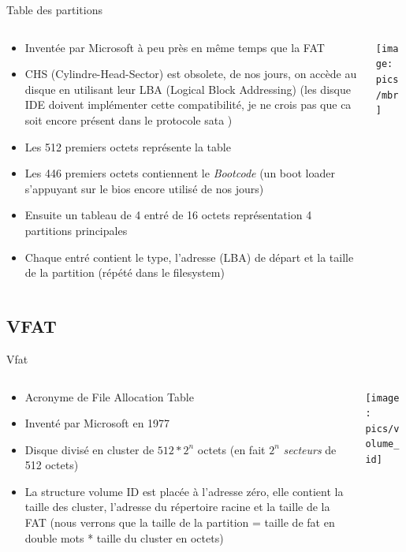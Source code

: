 \begin{frame}[fragile=singleslide]{Table des partitions}
  \begin{columns}
    \begin{column}{8cm}
      \begin{itemize}
      \item Inventée par Microsoft à peu près en même temps que la FAT
      \item CHS (Cylindre-Head-Sector) est  obsolete, de nos jours, on
        accède  au  disque  en   utilisant  leur  LBA  (Logical  Block
        Addressing)   (les  disque   IDE  doivent   implémenter  cette
        compatibilité, je ne crois pas que ca soit encore présent dans
        le protocole sata )
      \item Les 512 premiers octets représente la table
      \item Les 446 premiers octets contiennent le \emph{Bootcode} (un
        boot  loader s'appuyant  sur  le bios  encore  utilisé de  nos
        jours)
      \item Ensuite un tableau de  4 entré de 16 octets représentation
        4 partitions principales
      \item Chaque  entré contient le type, l'adresse  (LBA) de départ
        et la taille de la partition (répété dans le filesystem)
      \end{itemize}
    \end{column}
    \begin{column}{4cm}
      \texttt{[image: pics/mbr]}
    \end{column}
  \end{columns}
\end{frame}

\subsection{VFAT}

\begin{frame}[fragile=singleslide]{Vfat}
  \begin{columns}
    \begin{column}{7cm}
  \begin{itemize}
  \item Acronyme de File Allocation Table
  \item Inventé par Microsoft en 1977
  \item Disque divisé en cluster de  $512 * 2^n$ octets (en fait $2^n$
    \emph{secteurs} de 512 octets)
  \item  La structure  volume ID  est  placée à  l'adresse zéro,  elle
    contient la taille des  cluster, l'adresse du répertoire racine et
    la taille de la FAT (nous  verrons que la taille de la partition =
    taille de fat en double mots * taille du cluster en octets)
  \end{itemize}
    \end{column}
    \begin{column}{5cm}
      \texttt{[image: pics/volume\_id]}
    \end{column}
  \end{columns}
\end{frame}

